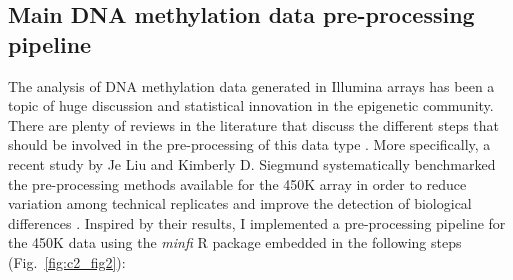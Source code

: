 \smallskip

\subsection{Main DNA methylation data pre-processing pipeline} \label{s:2.1.2}

\smallskip

The analysis of DNA methylation data generated in Illumina arrays has been a topic of huge discussion and statistical innovation in the epigenetic community. There are plenty of reviews in the literature that discuss the different steps that should be involved in the pre-processing of this data type \citep{Wilhelm-Benartzi2013,Morris2015,Liu2016}. More specifically, a recent study by Je Liu and Kimberly D. Siegmund systematically benchmarked the pre-processing methods available for the 450K array in order to reduce variation among technical replicates and improve the detection of biological differences \citep{Liu2016}. Inspired by their results, I implemented a pre-processing pipeline for the 450K data using the \textit{minfi} R package \citep{Aryee2014} embedded in the following steps (Fig.~\ref{fig:c2_fig2}):


